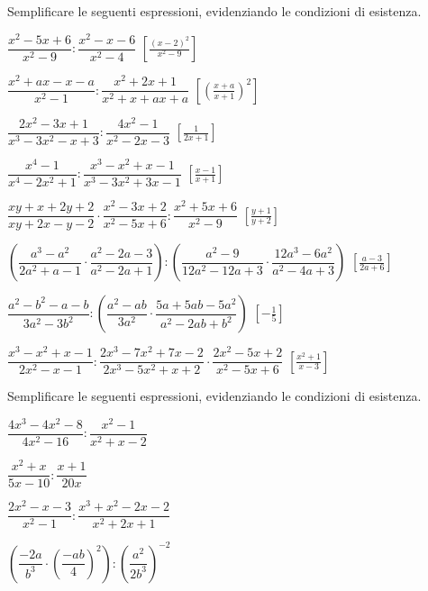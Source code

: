 \begin{esercizio}[\Ast]
\label{ese:19.19}
Semplificare le seguenti espressioni, evidenziando le condizioni di esistenza.
\begin{enumeratea}
 \item $\dfrac{x^{2}-5x+6}{x^{2}-9}:\dfrac{x^{2}-x-6}{x^{2}-4}$
  \hfill $\left[\frac{(x-2)^{2}}{x^{2}-9}\right]$
 \item $\dfrac{x^{2}+ax-x-a}{x^{2}-1}:\dfrac{x^{2}+2x+1}{x^{2}+x+ax+a}$
  \hfill $\left[\left(\frac{x+a}{x+1}\right)^{2}\right]$
 \item $\dfrac{2x^{2}-3x+1}{x^{3}-3x^{2}-x+3}:\dfrac{4x^{2}-1}{x^{2}-2x-3}$
  \hfill $\left[\frac{1}{2x+1}\right]$
 \item $\dfrac{x^{4}-1}{x^{4}-2x^{2}+1}:
        \dfrac{x^{3}-x^{2}+x-1}{x^{3}-3x^{2}+3x-1}$
  \hfill $\left[\frac{x-1}{x+1}\right]$
 \item $\dfrac{xy+x+2y+2}{xy+2x-y-2}\cdot
 \dfrac{x^{2}-3x+2}{x^{2}-5x+6}:\dfrac{x^{2}+5x+6}{x^{2}-9}$
  \hfill $\left[\frac{y+1}{y+2}\right]$
 \item $\left(\dfrac{a^{3}-a^{2}}{2a^{2}+a-1}\cdot
 \dfrac{a^{2}-2a-3}{a^{2}-2a+1}\right):
 \left(\dfrac{a^{2}-9}{12a^{2}-12a+3}\cdot
 \dfrac{12a^{3}-6a^{2}}{a^{2}-4a+3}\right)$
  \hfill $\left[\frac{a-3}{2a+6}\right]$
 \item $\dfrac{a^{2}-b^{2}-a-b}{3a^{2}-3b^{2}}:
 \left(\dfrac{a^{2}-ab}{3a^{2}}\cdot
 \dfrac{5a+5ab-5a^{2}}{a^{2}-2ab+b^{2}}\right)$
  \hfill $\left[-{\frac{1}{5}}\right]$
 \item $\dfrac{x^{3}-x^{2}+x-1}{2x^{2}-x-1}:
 \dfrac{2x^{3}-7x^{2}+7x-2}{2x^{3}-5x^{2}+x+2}\cdot
 \dfrac{2x^{2}-5x+2}{x^{2}-5x+6}$
  \hfill $\left[\frac{x^{2}+1}{x-3}\right]$
\end{enumeratea}
\end{esercizio}

\begin{esercizio}
\label{ese:19.21}
Semplificare le seguenti espressioni, evidenziando le condizioni di esistenza.
\begin{multicols}{2}
\begin{enumeratea}
 \item $\dfrac{4x^{3}-4x^{2}-8}{4x^{2}-16}:\dfrac{x^{2}-1}{x^{2}+x-2}$
 \item $\dfrac{x^{2}+x}{5x-10}:\dfrac{x+1}{20x}$
 \item $\dfrac{2x^{2}-x-3}{x^{2}-1}:\dfrac{x^{3}+x^{2}-2x-2}{x^{2}+2x+1}$
 \item $\left(\dfrac{-{2a}}{b^{3}}\cdot
        \left(\dfrac{-{ab}}{4}\right)^{2}\right):
        \left(\dfrac{a^{2}}{2b^{3}}\right)^{-2}$%
\end{enumeratea}
\end{multicols}
\end{esercizio}


